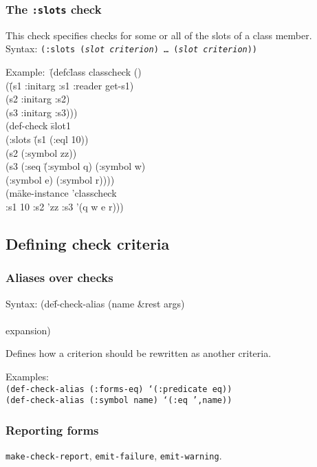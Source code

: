 \documentclass{article}
\begin{document}
\subsubsection{The \texttt{:slots} check} 
This check specifies checks for some or all of the slots of a class
member.
\\ Syntax: \texttt{(:slots  (\textit{slot} \textit{criterion})  \ldots\ (\textit{slot} \textit{criterion}))}
{\ttfamily\begin{tabbing}
\textrm{Example:}\ \= (defc\=lass classcheck ()
\\ \> \> (\=(s1 :initarg :s1 :reader get-s1)
\\ \> \> \> (s2 :initarg :s2)
\\ \> \> \> (s3 :initarg :s3)))
\\ \> (def-check \=slot1
\\ \> \>  (:slots \=(s1 (:eql 10))
\\ \> \>  \>(s2 (:symbol zz))
\\ \> \>  \>(s3 (:seq \=(:symbol q) (:symbol w)
\\ \> \>  \> \> (:symbol e) (:symbol r))))
\\ \> \>  (m\=ake-instance 'classcheck
\\ \> \> \>  :s1 10 :s2 'zz :s3 '(q w e r)))
\end{tabbing}}

\subsection{Defining check criteria}
\subsubsection{Aliases over checks}
{\ttfamily\begin{tabbing}
\textrm{Syntax: 
}(de\=f-check-alias (name \&rest args)
\\ \> [ documentation ]
\\ \> expansion)
\end{tabbing}}
Defines how a criterion should be rewritten as another criteria.

Examples:
\\ \texttt{(def-check-alias (:forms-eq) `(:predicate eq))}
\\ \texttt{(def-check-alias (:symbol name) `(:eq ',name))}
\par{}

\subsubsection{Reporting forms}
\texttt{make-check-report}, \texttt{emit-failure}, \texttt{emit-warning}.
\par{}
\end{document}
